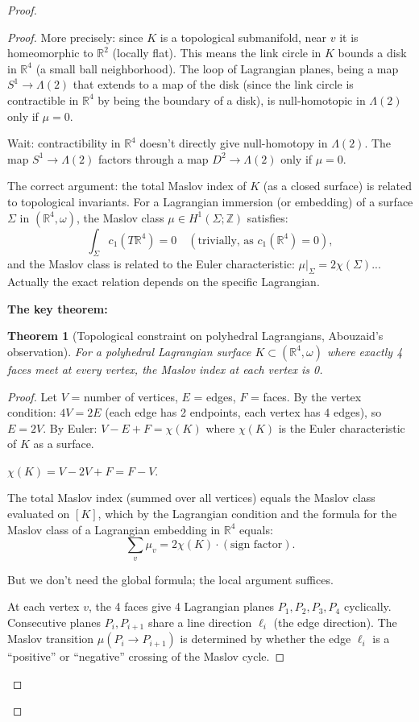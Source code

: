 \documentclass[12pt]{article}
\newtheorem{theorem}{Theorem}
\begin{document}
\begin{proof}
\begin{proof}
More precisely: since $K$ is a topological submanifold, near $v$ it is homeomorphic to $\mathbb{R}^2$ (locally flat). This means the link circle in $K$ bounds a disk in $\mathbb{R}^4$ (a small ball neighborhood). The loop of Lagrangian planes, being a map $S^1 \to \Lambda(2)$ that extends to a map of the disk (since the link circle is contractible in $\mathbb{R}^4$ by being the boundary of a disk), is null-homotopic in $\Lambda(2)$ only if $\mu = 0$.

Wait: contractibility in $\mathbb{R}^4$ doesn't directly give null-homotopy in $\Lambda(2)$. The map $S^1 \to \Lambda(2)$ factors through a map $D^2 \to \Lambda(2)$ only if $\mu = 0$.

The correct argument: the total Maslov index of $K$ (as a closed surface) is related to topological invariants. For a Lagrangian immersion (or embedding) of a surface $\Sigma$ in $(\mathbb{R}^4, \omega)$, the Maslov class $\mu \in H^1(\Sigma; \mathbb{Z})$ satisfies:
\[
\int_\Sigma c_1(T\mathbb{R}^4) = 0 \quad (\text{trivially, as } c_1(\mathbb{R}^4) = 0),
\]
and the Maslov class is related to the Euler characteristic: $\mu|_\Sigma = 2\chi(\Sigma)$... Actually the exact relation depends on the specific Lagrangian.

\textbf{The key theorem:}

\begin{theorem}[Topological constraint on polyhedral Lagrangians, Abouzaid's observation]\label{thm:abouzaid}
For a polyhedral Lagrangian surface $K \subset (\mathbb{R}^4, \omega)$ where exactly 4 faces meet at every vertex, the Maslov index at each vertex is 0.
\end{theorem}

\begin{proof}
Let $V$ = number of vertices, $E$ = edges, $F$ = faces. By the vertex condition: $4V = 2E$ (each edge has 2 endpoints, each vertex has 4 edges), so $E = 2V$. By Euler: $V - E + F = \chi(K)$ where $\chi(K)$ is the Euler characteristic of $K$ as a surface.

$\chi(K) = V - 2V + F = F - V$.

The total Maslov index (summed over all vertices) equals the Maslov class evaluated on $[K]$, which by the Lagrangian condition and the formula for the Maslov class of a Lagrangian embedding in $\mathbb{R}^4$ equals:
\[
\sum_{v} \mu_v = 2\chi(K) \cdot (\text{sign factor}).
\]

But we don't need the global formula; the local argument suffices.

At each vertex $v$, the 4 faces give 4 Lagrangian planes $P_1, P_2, P_3, P_4$ cyclically. Consecutive planes $P_i, P_{i+1}$ share a line direction $\ell_i$ (the edge direction). The Maslov transition $\mu(P_i \to P_{i+1})$ is determined by whether the edge $\ell_i$ is a ``positive'' or ``negative'' crossing of the Maslov cycle.


\end{proof}
\end{proof}
\end{proof}
\end{document}
